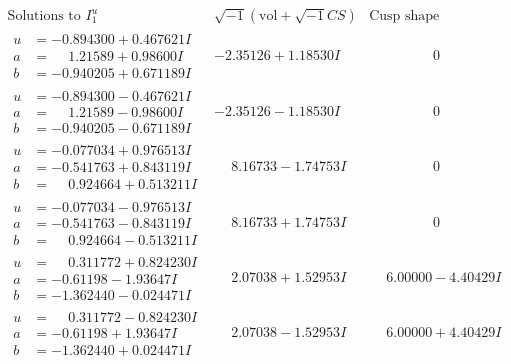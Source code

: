 \documentclass[1p]{elsarticle_modified}
\theoremstyle{definition}
\newcommand{\I}{\sqrt{-1}}
\begin{document}
$$\begin{array}{c|c|c}  
\text{Solutions to }I^u_{1}& \I (\text{vol} + \sqrt{-1}CS) & \text{Cusp shape}\\
 \hline 
\begin{aligned}
u &= -0.894300 + 0.467621 I \\
a &= \phantom{-}1.21589 + 0.98600 I \\
b &= -0.940205 + 0.671189 I\end{aligned}
 & -2.35126 + 1.18530 I & \phantom{-0.000000 } 0 \\ \hline\begin{aligned}
u &= -0.894300 - 0.467621 I \\
a &= \phantom{-}1.21589 - 0.98600 I \\
b &= -0.940205 - 0.671189 I\end{aligned}
 & -2.35126 - 1.18530 I & \phantom{-0.000000 } 0 \\ \hline\begin{aligned}
u &= -0.077034 + 0.976513 I \\
a &= -0.541763 + 0.843119 I \\
b &= \phantom{-}0.924664 + 0.513211 I\end{aligned}
 & \phantom{-}8.16733 - 1.74753 I & \phantom{-0.000000 } 0 \\ \hline\begin{aligned}
u &= -0.077034 - 0.976513 I \\
a &= -0.541763 - 0.843119 I \\
b &= \phantom{-}0.924664 - 0.513211 I\end{aligned}
 & \phantom{-}8.16733 + 1.74753 I & \phantom{-0.000000 } 0 \\ \hline\begin{aligned}
u &= \phantom{-}0.311772 + 0.824230 I \\
a &= -0.61198 - 1.93647 I \\
b &= -1.362440 - 0.024471 I\end{aligned}
 & \phantom{-}2.07038 + 1.52953 I & \phantom{-}6.00000 - 4.40429 I \\ \hline\begin{aligned}
u &= \phantom{-}0.311772 - 0.824230 I \\
a &= -0.61198 + 1.93647 I \\
b &= -1.362440 + 0.024471 I\end{aligned}
 & \phantom{-}2.07038 - 1.52953 I & \phantom{-}6.00000 + 4.40429 I \\ \hline\begin{aligned}

\end{aligned}
\end{array}$$
\end{document}
